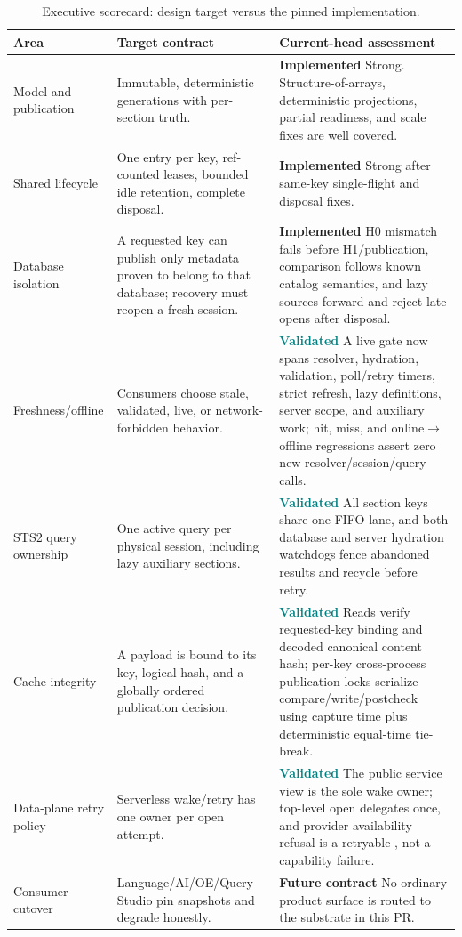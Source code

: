 \documentclass[11pt]{article}
\newcommand{\code}[1]{\texttt{\detokenize{#1}}}
\newcommand{\impl}{\textcolor{greenish}{\textbf{Implemented}}}
\newcommand{\valid}{\textcolor{teal}{\textbf{Validated}}}
\newcommand{\future}{\textcolor{amber}{\textbf{Future contract}}}
\begin{document}
\begin{table}[H]
\centering
\small
\caption{Executive scorecard: design target versus the pinned implementation.}
\label{tab:scorecard}
\begin{tabularx}{\textwidth}{@{}p{}p{}X@{}}
\toprule
\textbf{Area} & \textbf{Target contract} & \textbf{Current-head assessment}\\
\midrule
Model and publication & Immutable, deterministic generations with per-section truth. & \impl{} Strong. Structure-of-arrays, deterministic projections, partial readiness, and scale fixes are well covered.\\
Shared lifecycle & One entry per key, ref-counted leases, bounded idle retention, complete disposal. & \impl{} Strong after same-key single-flight and disposal fixes.\\
Database isolation & A requested key can publish only metadata proven to belong to that database; recovery must reopen a fresh session. & \impl{} H0 mismatch fails before H1/publication, comparison follows known catalog semantics, and lazy sources forward \code{recycle()} and reject late opens after disposal.\\
Freshness/offline & Consumers choose stale, validated, live, or network-forbidden behavior. & \valid{} A live gate now spans resolver, hydration, validation, poll/retry timers, strict refresh, lazy definitions, server scope, and auxiliary work; hit, miss, and online$\rightarrow$offline regressions assert zero new resolver/session/query calls.\\
STS2 query ownership & One active query per physical session, including lazy auxiliary sections. & \valid{} All section keys share one FIFO lane, and both database and server hydration watchdogs fence abandoned results and recycle before retry.\\
Cache integrity & A payload is bound to its key, logical hash, and a globally ordered publication decision. & \valid{} Reads verify requested-key binding and decoded canonical content hash; per-key cross-process publication locks serialize compare/write/postcheck using capture time plus deterministic equal-time tie-break.\\
Data-plane retry policy & Serverless wake/retry has one owner per open attempt. & \valid{} The public service view is the sole wake owner; top-level open delegates once, and provider availability refusal is a retryable \code{unavailable}, not a capability failure.\\
Consumer cutover & Language/AI/OE/Query Studio pin snapshots and degrade honestly. & \future{} No ordinary product surface is routed to the substrate in this PR.\\
\bottomrule
\end{tabularx}
\end{table}
\end{document}
